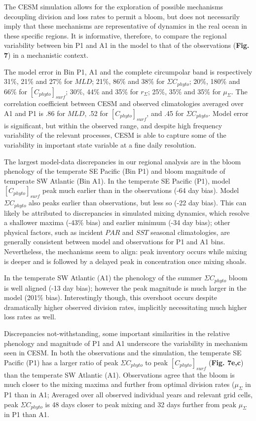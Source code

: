 The CESM simulation allows for the exploration of possible mechanisms decoupling division and loss rates to permit a bloom, but does not necessarily imply that these mechanisms are representative of dynamics in the real ocean in these specific regions. It is informative, therefore, to compare the regional variability between bin P1 and A1 in the model to that of the observations (\textbf{Fig. 7}) in a mechanistic context.

The model error in Bin P1, A1 and the complete circumpolar band is respectively 31\%, 21\% and 27\% for $MLD$; 21\%, 86\% and 38\% for $\Sigma C_{phyto}$; 20\%, 180\% and 66\% for $[C_{phyto}]_{surf}$; 30\%, 44\% and 35\% for $r_\Sigma$; 25\%, 35\% and 35\% for $\mu_\Sigma$. The correlation coefficient between CESM and observed climatologies averaged over A1 and P1 is .86 for $MLD$, .52 for $[C_{phyto}]_{surf}$, and .45 for $\Sigma C_{phyto}$. Model error is significant, but within the observed range, and despite high frequency variability of the relevant processes, CESM is able to capture some of the variability in important state variable at a fine daily resolution.

The largest model-data discrepancies in our regional analysis are in the bloom phenology of the temperate SE Pacific (Bin P1) and bloom magnitude of temperate SW Atlantic (Bin A1). In the temperate SE Pacific (P1), model $[C_{phyto}]_{surf}$ peak much earlier than in the observations (-64 day bias). Model $\Sigma C_{phyto}$ also peaks earlier than observations, but less so (-22 day bias). This can likely be attributed to discrepancies in simulated mixing dynamics, which resolve a shallower maxima (-43\% bias) and earlier minimum (-34 day bias); other physical factors, such as incident $PAR$ and $SST$ seasonal climatologies, are generally consistent between model and observations for P1 and A1 bins. Nevertheless, the mechanisms seem to align: peak inventory occurs while mixing is deeper and is followed by a delayed peak in concentration once mixing shoals. 

In the temperate SW Atlantic (A1) the phenology of the summer $\Sigma C_{phyto}$ bloom is well aligned (-13 day bias); however the peak magnitude is much larger in the model (201\% bias). Interestingly though, this overshoot occurs despite dramatically higher observed division rates, implicitly necessitating much higher loss rates as well.

Discrepancies not-withstanding, some important similarities in the relative phenology and magnitude of P1 and A1 underscore the variability in mechanism seen in CESM. In both the observations and the simulation, the temperate SE Pacific (P1) has a larger ratio of peak $\Sigma C_{phyto}$ to peak $[C_{phyto}]_{surf}$ (\textbf{Fig. 7e,c}) than the temperate SW Atlantic (A1). Observations agree that the bloom is much closer to the mixing maxima and further from optimal division rates ($\mu_\Sigma$ in P1 than in A1; Averaged over all observed individual years and relevant grid cells, peak $\Sigma C_{phyto}$ is 48 days closer to peak mixing and 32 days further from peak $\mu_\Sigma$ in P1 than A1. 

